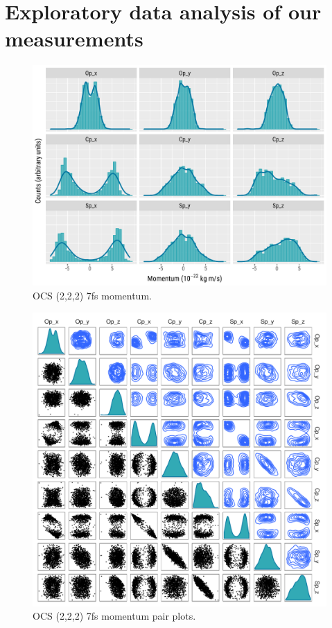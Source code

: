 \pagebreak
\section{Exploratory data analysis of our measurements}

\begin{figure}
  \centering
  \includegraphics[width=\textwidth]{Plots/OCS2227fsMomentum}
  \caption[OCS (2,2,2) 7fs momentum.]
  {OCS (2,2,2) 7fs momentum.}
  \label{fig:OCS2227fsMomentum}
\end{figure}
\clearpage

\pagebreak
\begin{figure}
  \centering
  \includegraphics[width=\textwidth]{Plots/OCS2227fsMomentum_ggpairs}
  \caption[OCS (2,2,2) 7fs momentum pair plots.]
  {OCS (2,2,2) 7fs momentum pair plots.}
  \label{fig:OCS2227fsMomentumPairPlots}
\end{figure}
\clearpage

